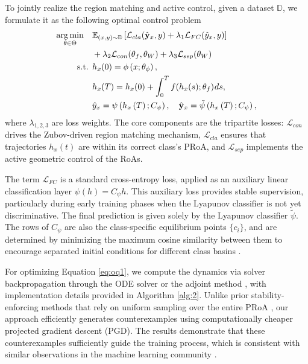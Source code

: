 \documentclass[journal]{IEEEtran}
\begin{document}
To jointly realize the region matching and active control, given a dataset $\mathbb{D}$, we formulate it as the following optimal control problem
\begin{align}
	\mathop{\arg \min}_{\theta \in \Theta} \quad  &\mathbb{E}_{(x,y) \sim \mathbb{D}}    \left[ \mathcal{L}_{cla}(\hat{\mathbf{y}}_x, y) + \lambda_1 \mathcal{L}_{FC}(\hat{y}_x, y) \right]  \nonumber\\
	&+ \lambda_2 \mathcal{L}_{con}(\theta_f,\theta_W) + \lambda_3\mathcal{L}_{sep}(\theta_W) \label{eq:oq1} \\
	\text{s.t. }  &h_{x}(0)=\phi \left( {x;{\theta _\phi }} \right),  \nonumber \\
	&h_{x}(T) = h_x(0)+\int_0^T f (h_x(s);{\theta _f}){\mkern 1mu} ds, \nonumber\\
	&\hat{y}_{x} = \psi \left( {h_{x}\left( T \right);{C _\psi }} \right),  \quad  \hat{\mathbf{y}}_x = \tilde  \psi \left( {h_{x}\left( T \right);{C _\psi }} \right), \nonumber
\end{align}
where $\lambda_{1,2,3}$ are loss weights. The core components are the tripartite losses: $\mathcal{L}_{con}$ drives the Zubov-driven region matching mechanism, $\mathcal{L}_{cla}$ ensures that trajectories $h_x(t)$ are within its correct class's PRoA, and $\mathcal{L}_{sep}$ implements the active geometric control of the RoAs. 

The term $\mathcal{L}_{FC}$ is a standard cross-entropy loss, applied as an auxiliary linear classification layer $\psi(h) = C_\psi h$. This auxiliary loss provides stable supervision, particularly during early training phases when the Lyapunov classifier is not yet discriminative. The final prediction is given solely by the Lyapunov classifier $\tilde{\psi}$. The rows of $C_\psi$  are also the class-specific equilibrium points $\{c_i\}$, and are determined by minimizing the maximum cosine similarity between them to encourage separated initial conditions for different class basins \cite{NEURIPS2021_7d5430cf}.

For optimizing Equation \eqref{eq:oq1}, we compute the dynamics via solver backpropagation through the ODE solver or the adjoint method \cite{NEURIPS2018_69386f6b,kidger2021hey,10045756}, with implementation details provided in Algorithm \ref{alg:2}. Unlike prior stability-enforcing methods that rely on uniform sampling over the entire PRoA \cite{huang2022fi,pmlr-v162-rodriguez22a}, our approach efficiently generates counterexamples using computationally cheaper projected gradient descent (PGD). The results demonstrate that these counterexamples sufficiently guide the training process,  which is consistent with similar observations in the machine learning community \cite{balunovic2020adversarial,de2022ibp}.
\end{document}
